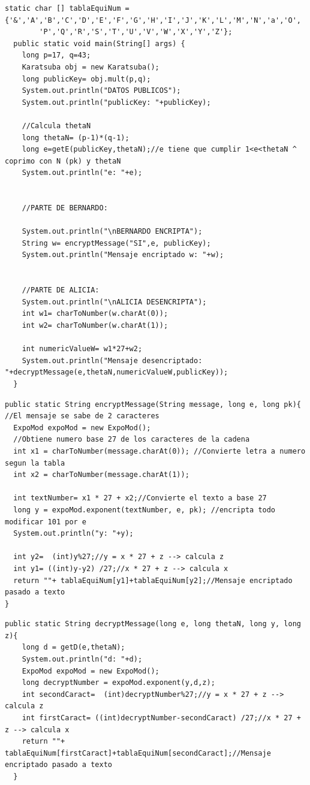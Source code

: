 \begin{lstlisting}[style=java,caption= Metodo main (Clase criptografia) ]
  static char [] tablaEquiNum = {'&','A','B','C','D','E','F','G','H','I','J','K','L','M','N','a','O',
        'P','Q','R','S','T','U','V','W','X','Y','Z'};
  public static void main(String[] args) {
    long p=17, q=43;
    Karatsuba obj = new Karatsuba();
    long publicKey= obj.mult(p,q);
    System.out.println("DATOS PUBLICOS");
    System.out.println("publicKey: "+publicKey);

    //Calcula thetaN
    long thetaN= (p-1)*(q-1);
    long e=getE(publicKey,thetaN);//e tiene que cumplir 1<e<thetaN ^ coprimo con N (pk) y thetaN
    System.out.println("e: "+e);


    //PARTE DE BERNARDO:

    System.out.println("\nBERNARDO ENCRIPTA");
    String w= encryptMessage("SI",e, publicKey);
    System.out.println("Mensaje encriptado w: "+w);


    //PARTE DE ALICIA:
    System.out.println("\nALICIA DESENCRIPTA");
    int w1= charToNumber(w.charAt(0));
    int w2= charToNumber(w.charAt(1));

    int numericValueW= w1*27+w2;
    System.out.println("Mensaje desencriptado: "+decryptMessage(e,thetaN,numericValueW,publicKey));
  }

\end{lstlisting}

\begin{lstlisting}[style=java,caption= Metodo encryptMessage ]
  public static String encryptMessage(String message, long e, long pk){ //El mensaje se sabe de 2 caracteres
  ExpoMod expoMod = new ExpoMod();
  //Obtiene numero base 27 de los caracteres de la cadena
  int x1 = charToNumber(message.charAt(0)); //Convierte letra a numero segun la tabla
  int x2 = charToNumber(message.charAt(1));

  int textNumber= x1 * 27 + x2;//Convierte el texto a base 27
  long y = expoMod.exponent(textNumber, e, pk); //encripta todo modificar 101 por e
  System.out.println("y: "+y);

  int y2=  (int)y%27;//y = x * 27 + z --> calcula z
  int y1= ((int)y-y2) /27;//x * 27 + z --> calcula x
  return ""+ tablaEquiNum[y1]+tablaEquiNum[y2];//Mensaje encriptado pasado a texto
}

\end{lstlisting}

\begin{lstlisting}[style=java,caption= Metodo decryptMessage ]
  public static String decryptMessage(long e, long thetaN, long y, long z){
    long d = getD(e,thetaN);
    System.out.println("d: "+d);
    ExpoMod expoMod = new ExpoMod();
    long decryptNumber = expoMod.exponent(y,d,z);
    int secondCaract=  (int)decryptNumber%27;//y = x * 27 + z --> calcula z
    int firstCaract= ((int)decryptNumber-secondCaract) /27;//x * 27 + z --> calcula x
    return ""+ tablaEquiNum[firstCaract]+tablaEquiNum[secondCaract];//Mensaje encriptado pasado a texto
  }

\end{lstlisting}

